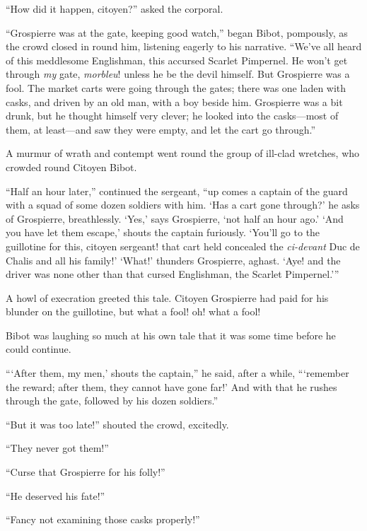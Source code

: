\documentclass[paper=5.5in:8.5in,BCOR=7mm,twoside,DIV=calc,12pt,usegeometry,chapterprefix,endperiod,headings=big]{scrbook}
\begin{document}
\enquote{How did it happen, citoyen?} asked the corporal.

\enquote{Grospierre was at the gate, keeping good watch,} began Bibot, pompously, as the crowd closed in round him, listening eagerly to his narrative. \enquote{We've all heard of this meddlesome Englishman, this accursed Scarlet Pimpernel. He won't get through \textit{my} gate, \textit{morbleu}! unless he be the devil himself. But Grospierre was a fool. The market carts were going through the gates; there was one laden with casks, and driven by an old man, with a boy beside him. Grospierre was a bit drunk, but he thought himself very clever; he looked into the casks---most of them, at least---and saw they were empty, and let the cart go through.}

A murmur of wrath and contempt went round the group of ill-clad wretches, who crowded round Citoyen Bibot.

\enquote{Half an hour later,} continued the sergeant, \enquote{up comes a captain of the guard with a squad of some dozen soldiers with him. \enquote{Has a cart gone through?} he asks of Grospierre, breathlessly. \enquote{Yes,} says Grospierre, \enquote{not half an hour ago.} \enquote{And you have let them escape,} shouts the captain furiously. \enquote{You'll go to the guillotine for this, citoyen sergeant! that cart held concealed the \textit{ci-devant} Duc de Chalis and all his family!} \enquote{What!} thunders Grospierre, aghast. \enquote{Aye! and the driver was none other than that cursed Englishman, the Scarlet Pimpernel.}}

A howl of execration greeted this tale. Citoyen Grospierre had paid for his blunder on the guillotine, but what a fool! oh! what a fool!

Bibot was laughing so much at his own tale that it was some time before he could continue.

\enquote{\enquote{After them, my men,} shouts the captain,} he said, after a while, \enquote{\enquote{remember the reward; after them, they cannot have gone far!} And with that he rushes through the gate, followed by his dozen soldiers.}

\enquote{But it was too late!} shouted the crowd, excitedly.

\enquote{They never got them!}

\enquote{Curse that Grospierre for his folly!}

\enquote{He deserved his fate!}

\enquote{Fancy not examining those casks properly!}
\end{document}
